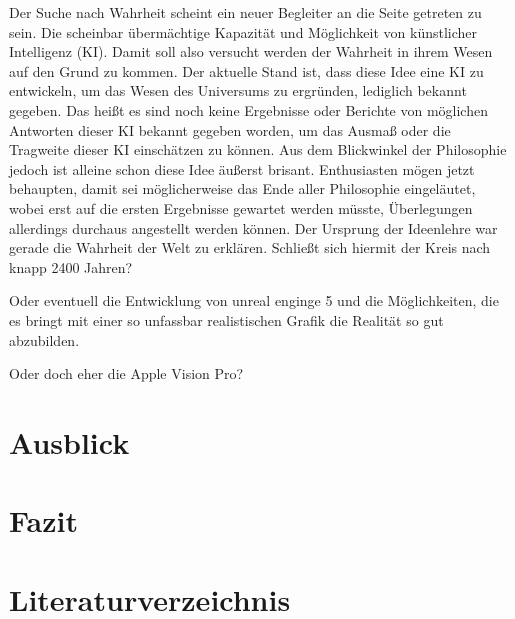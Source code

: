 \documentclass[12pt]{article}
\begin{document}
Der Suche nach Wahrheit scheint ein neuer Begleiter an die Seite getreten zu sein. Die scheinbar übermächtige Kapazität und Möglichkeit von künstlicher Intelligenz (KI). Damit soll also versucht werden der Wahrheit in ihrem Wesen auf den Grund zu kommen. Der aktuelle Stand ist, dass diese Idee eine KI zu entwickeln, um das Wesen des Universums zu ergründen, lediglich bekannt gegeben. Das heißt es sind noch keine Ergebnisse oder Berichte von möglichen Antworten dieser KI bekannt gegeben worden, um das Ausmaß oder die Tragweite dieser KI einschätzen zu können. Aus dem Blickwinkel der Philosophie jedoch ist alleine schon diese Idee äußerst brisant. Enthusiasten mögen jetzt behaupten, damit sei möglicherweise das Ende aller Philosophie eingeläutet, wobei erst auf die ersten Ergebnisse gewartet werden müsste, Überlegungen allerdings durchaus angestellt werden können.
Der Ursprung der Ideenlehre war gerade die Wahrheit der Welt zu erklären. Schließt sich hiermit der Kreis nach knapp 2400 Jahren?

Oder eventuell die Entwicklung von unreal enginge 5 und die Möglichkeiten, die es bringt mit einer so unfassbar realistischen Grafik die Realität so gut abzubilden.

Oder doch eher die Apple Vision Pro?
\section{Ausblick}
\section{Fazit}
\newpage
\nocite{politeia}
\nocite{Parmenides}
\section*{Literaturverzeichnis}
\printbibliography[keyword={Primärliteratur}, title={Primärliteratur}]
\printbibliography[keyword={Sekundärliteratur}, title={Sekundärliteratur}]
\end{document}
